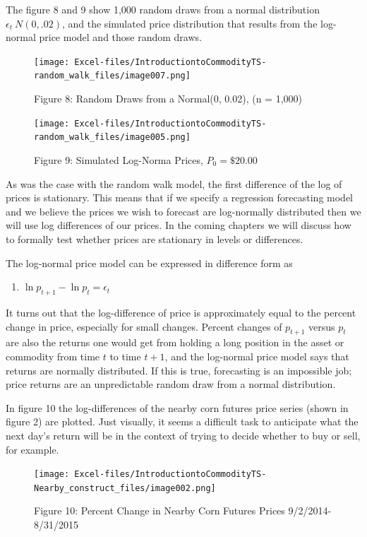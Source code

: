 \documentclass[
]{book}
\providecommand{\tightlist}{%
  \setlength{\itemsep}{0pt}\setlength{\parskip}{0pt}}
\begin{document}
The figure 8 and 9 show 1,000 random draws from a normal distribution \(\epsilon_t ~ N(0, .02)\), and the simulated price distribution that results from the log-normal price model and those random draws.

\begin{figure}
\centering
\texttt{[image: Excel-files/IntroductiontoCommodityTS-random\_walk\_files/image007.png]}
\caption{Figure 8: Random Draws from a Normal(0, 0.02), (n = 1,000)}
\end{figure}

\begin{figure}
\centering
\texttt{[image: Excel-files/IntroductiontoCommodityTS-random\_walk\_files/image005.png]}
\caption{Figure 9: Simulated Log-Norma Prices, \(P_0 = \$20.00\)}
\end{figure}

As was the case with the random walk model, the first difference of the log of prices is stationary. This means that if we specify a regression forecasting model and we believe the prices we wish to forecast are log-normally distributed then we will use log differences of our prices. In the coming chapters we will discuss how to formally test whether prices are stationary in levels or differences.

The log-normal price model can be expressed in difference form as

\begin{enumerate}
\def\labelenumi{(\arabic{enumi})}
\setcounter{enumi}{6}
\tightlist
\item
  \(\ln{p_{t+1}} - \ln{p_{t}} = \epsilon_t\)
\end{enumerate}

It turns out that the log-difference of price is approximately equal to the percent change in price, especially for small changes. Percent changes of \(p_{t+1}\) versus \(p_t\) are also the returns one would get from holding a long position in the asset or commodity from time \(t\) to time \(t+1\), and the log-normal price model says that returns are normally distributed. If this is true, forecasting is an impossible job; price returns are an unpredictable random draw from a normal distribution.

In figure 10 the log-differences of the nearby corn futures price series (shown in figure 2) are plotted. Just visually, it seems a difficult task to anticipate what the next day's return will be in the context of trying to decide whether to buy or sell, for example.

\begin{figure}
\centering
\texttt{[image: Excel-files/IntroductiontoCommodityTS-Nearby\_construct\_files/image002.png]}
\caption{Figure 10: Percent Change in Nearby Corn Futures Prices 9/2/2014-8/31/2015}
\end{figure}
\end{document}
